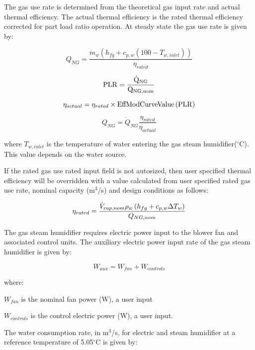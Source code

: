 The gas use rate is determined from the theoretical gas input rate and actual thermal efficiency. The actual thermal efficiency is the rated thermal efficiency corrected for part load ratio operation. At steady state the gas use rate is given by:

\begin{equation}
Q_{NG} = \frac{\dot{m}_w \left(h_{fg}+c_{p,w}\left(100-T_{w,inlet}\right)\right)}{\eta_{rated}}
\end{equation}

\begin{equation}
\rm{PLR} = \frac{\dot{Q}_{NG}}{Q_{NG,nom}}
\end{equation}

\begin{equation}
\eta_{actual} = \eta_{rated} \times \rm{EffModCurveValue}\left(PLR\right)
\end{equation}

\begin{equation}
Q_{NG} = \dot{Q}_{NG}\frac{\eta_{rated}}{\eta_{actual}}
\end{equation}

where \({T_{w,inlet}}\) is the temperature of water entering the gas steam humidifier(\(^{\circ}\)C). This value depends on the water source.

If the rated gas use rated input field is not autosized, then user specified thermal efficiency will be overridden with a value calculated from user specified rated gas use rate, nominal capacity (m\(^3\)/s) and design conditions as follows:

\begin{equation}
 \eta_{rated} = \frac{\dot{V}_{cap,nom} \rho_w \left(h_{fg}+c_{p,w}\Delta T_w\right)}{Q_{NG,nom}}
\end{equation}

The gas steam humidifier requires electric power input to the blower fan and associated control units. The auxiliary electric power input rate of the gas steam humidifier is given by:

\begin{equation}
W_{aux} = W_{fan} + W_{controls}
\end{equation}

where:

\({W_{fan}}\) is the nominal fan power (W), a user input

\({W_{controls}}\) is the control electric power (W), a user input.

The water consumption rate, in m\(^3\)/s, for electric and steam humidifier at a reference temperature of 5.05\(^{\circ}\)C is given by:

